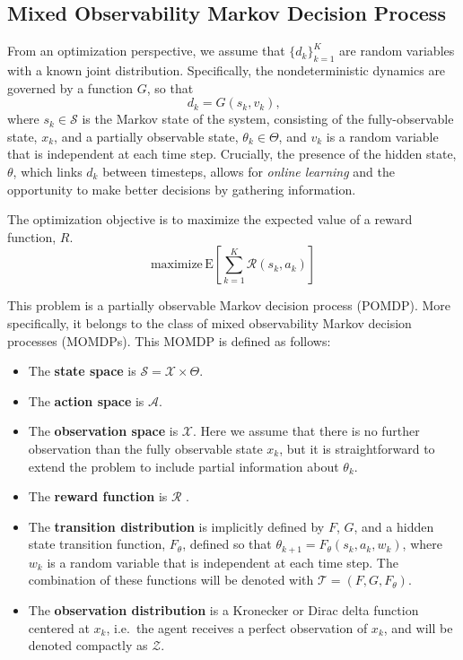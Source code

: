 \documentclass{article}
\newcommand{\sspace}{\ensuremath{\mathcal{S}} }
\newcommand{\aspace}{\ensuremath{\mathcal{A}} }
\newcommand{\tdist}{\ensuremath{\mathcal{T}} }
\newcommand{\odist}{\ensuremath{\mathcal{Z}} }
\newcommand{\reward}{\ensuremath{\mathcal{R}} }
\begin{document}
\subsection{Mixed Observability Markov Decision Process} \label{sec:momdp}

From an optimization perspective, we assume that $\{d_k\}_{k=1}^K$ are random variables with a known joint distribution. Specifically, the nondeterministic dynamics are governed by a function $G$, so that
\begin{equation}
    d_k = G(s_k, v_k) \text{,}
\end{equation}
where $s_k \in \sspace$ is the Markov state of the system, consisting of the fully-observable state, $x_k$, and a partially observable state, $\theta_k \in \Theta$, and $v_k$ is a random variable that is independent at each time step.
Crucially, the presence of the hidden state, $\theta$, which links $d_k$ between timesteps, allows for \emph{online learning} and the opportunity to make better decisions by gathering information.

The optimization objective is to maximize the expected value of a reward function, $R$.
\begin{equation}
    \text{maximize}\, \text{E} \left[ \sum_{k=1}^K \reward(s_k, a_k) \right]
    \label{eq:pomdpobj}
\end{equation}

This problem is a partially observable Markov decision process (POMDP).
More specifically, it belongs to the class of mixed observability Markov decision processes (MOMDPs).
This MOMDP is defined as follows:

\begin{itemize}
    \item The \textbf{state space} is $\sspace = \mathcal{X} \times \Theta$.
    \item The \textbf{action space} is $\aspace$.
    \item The \textbf{observation space} is $\mathcal{X}$. Here we assume that there is no further observation than the fully observable state $x_k$, but it is straightforward to extend the problem to include partial information about $\theta_k$.
    \item The \textbf{reward function} is \reward.
    \item The \textbf{transition distribution} is implicitly defined by $F$, $G$, and a hidden state transition function, $F_\theta$, defined so that $\theta_{k+1} = F_\theta(s_k, a_k, w_k)$, where $w_k$ is a random variable that is independent at each time step. The combination of these functions will be denoted with $\tdist = (F, G, F_\theta)$.
    \item The \textbf{observation distribution} is a Kronecker or Dirac delta function centered at $x_k$, i.e.\ the agent receives a perfect observation of $x_k$, and will be denoted compactly as $\odist$.
\end{itemize}
\end{document}
